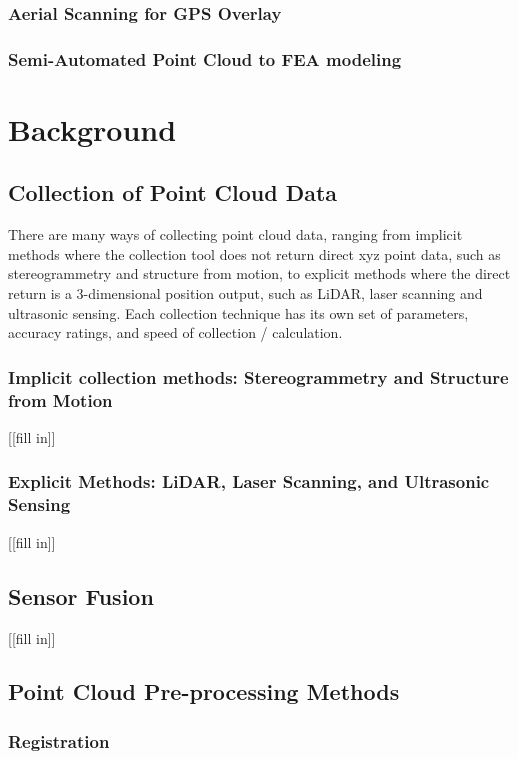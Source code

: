 \documentclass[12pt]{drexelthesis}
\let\Oldsection\section
\renewcommand{\section}{\FloatBarrier\Oldsection}
\let\Oldsubsection\subsection
\renewcommand{\subsection}{\FloatBarrier\Oldsubsection}
\begin{document}
\cite{RN30}
\subsection{Aerial Scanning for GPS Overlay}
\label{subsec:UAVscanning}
\subsection{Semi-Automated Point Cloud to FEA modeling}
\label{subsec:SemiFEA}
\cite{RN29} \cite{RN31} \cite{RN38} \cite{RN54}
%
%
\chapter{Background}
\label{chap:background}
\section{Collection of Point Cloud Data}
\label{sec:PCcollection}
There are many ways of collecting point cloud data, ranging from implicit methods where the collection tool does not return direct xyz point data, such as stereogrammetry and structure from motion, to explicit methods where the direct return is a 3-dimensional position output, such as LiDAR, laser scanning and ultrasonic sensing. Each collection technique has its own set of parameters, accuracy ratings, and speed of collection / calculation.
\subsection{Implicit collection methods: Stereogrammetry and Structure from Motion}
\label{subsec:implicit}
[[fill in]]
\cite{RN20}
\subsection{Explicit Methods: LiDAR, Laser Scanning, and Ultrasonic Sensing}
\label{subsec:explicit}
[[fill in]]
\section{Sensor Fusion}
\label{sec:fusion}
[[fill in]]
\section{Point Cloud Pre-processing Methods}
\label{sec:preprocessing}
\subsection{Registration}
\end{document}
